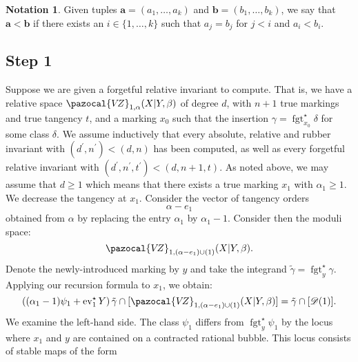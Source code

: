 \documentclass[11pt]{amsart}
\newcommand{\VZ}{\pazocal{V\!Z}}
\newcommand{\st}{\star}
\newcommand{\ev}{\operatorname{ev}}
\newcommand{\fgt}{\operatorname{fgt}}
\newcommand{\Dcal}{\mathcal{D}}
\theoremstyle{definition}
\newtheorem{notation}[thm]{Notation}
\theoremstyle{definition}
\begin{document}
\begin{notation}Given tuples $\mathbf{a}=(a_1,\ldots,a_k)$ and $\mathbf{b}=(b_1,\ldots,b_k)$, we say that $\mathbf{a}<\mathbf{b}$ if there exists an $i \in \{1,\ldots,k\}$ such that $a_j = b_j$ for $j < i$ and $a_i < b_i$.\end{notation}

\subsection*{Step 1} Suppose we are given a forgetful relative invariant to compute. That is, we have a relative space $\VZ_{1,\alpha}(X|Y,\beta)$ of degree $d$, with $n+1$ true markings and true tangency $t$, and a marking $x_0$ such that the insertion $\gamma=\fgt_{x_0}^\star \delta$ for some class $\delta$. We assume inductively that every absolute, relative and rubber invariant with $(d^\prime,n^\prime) < (d,n)$ has been computed, as well as every forgetful relative invariant with $(d^\prime,n^\prime,t^\prime) < (d,n+1,t)$. As noted above, we may assume that $d \geq 1$ which means that there exists a true marking $x_1$ with $\alpha_1 \geq 1$. We decrease the tangency at $x_1$. Consider the vector of tangency orders
\begin{equation*} \alpha - e_1 \end{equation*}
obtained from $\alpha$ by replacing the entry $\alpha_1$ by $\alpha_1-1$. Consider then the moduli space:
\begin{equation*} \VZ_{1,(\alpha-e_1) \cup (1)}(X|Y,\beta). \end{equation*}
Denote the newly-introduced marking by $y$ and take the integrand $\tilde\gamma=\fgt_y^\st \gamma$. Applying our recursion formula to $x_1$, we obtain:
\begin{equation}\label{step 1 recursion}\left( (\alpha_1-1)\psi_1 + \ev_1^\st Y\right) \tilde\gamma \cap [\VZ_{1,(\alpha-e_1) \cup (1)}(X|Y,\beta)] = \tilde\gamma \cap [\Dcal(1)].\end{equation}
We examine the left-hand side. The class $\psi_1$ differs from $\fgt_y^\st \psi_1$ by the locus where $x_1$ and $y$ are contained on a contracted rational bubble. This locus consists of stable maps of the form \medskip
\end{document}
